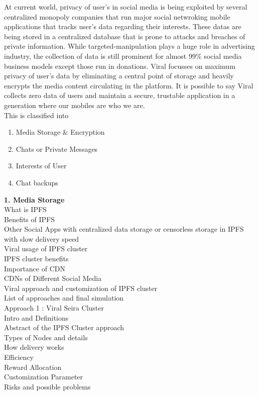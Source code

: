 \documentclass[conference]{IEEEtran}
\begin{document}
At current world, privacy of user's in social media is being exploited by several centralized monopoly companies that run major social netwroking mobile applications that tracks user's data regarding their interests. These datas are being stored in a centralized database that is prone to attacks and breaches of private information. While targeted-manipulation plays a huge role in advertising industry, the collection of data is still prominent for almost 99\% social media business models except those run in donations. Viral focusses on maximum privacy of user's data by eliminating a central point of storage and heavily encrypts the media content circulating in the platform. It is possible to say Viral collects zero data of users and maintain a secure, trustable application in a generation where our mobiles are who we are.\\

This is classified into
\begin{enumerate}[wide, labelwidth=!, labelindent=0pt]
\item Media Storage \& Encryption
\item Chats or Private Messages
\item Interests of User
\item Chat backups
\end{enumerate}


\textbf{1. Media Storage}\\

What is IPFS\\
Benefits of IPFS\\
Other Social Apps with centralized data storage or censorless storage in IPFS with slow delivery speed\\
Viral usage of IPFS cluster\\
IPFS cluster benefits\\
Importance of CDN\\
CDNs of Different Social Media\\
Viral approach and customization of IPFS cluster\\
List of approaches and final simulation\\

Approach 1 : Viral Seira Cluster\\

Intro and Definitions\\
Abstract of the IPFS Cluster approach\\
Types of Nodes and details\\
How delivery works\\
Efficiency\\
Reward Allocation\\
Customization Parameter\\
Risks and possible problems\\
\end{document}
